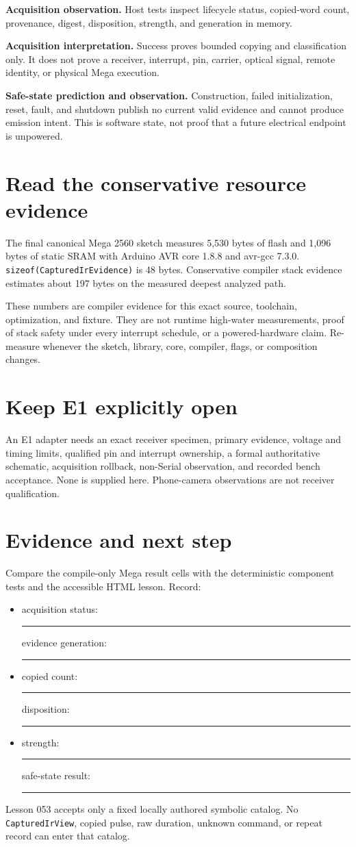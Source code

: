 \documentclass[10pt]{article}
\newcommand{\blankline}{\rule{0.78in}{0.4pt}}
\begin{document}
\textbf{Acquisition observation.} Host tests inspect lifecycle status,
copied-word count, provenance, digest, disposition, strength, and generation
in memory.

\textbf{Acquisition interpretation.} Success proves bounded copying and
classification only. It does not prove a receiver, interrupt, pin, carrier,
optical signal, remote identity, or physical Mega execution.

\textbf{Safe-state prediction and observation.} Construction, failed
initialization, reset, fault, and shutdown publish no current valid evidence
and cannot produce emission intent. This is software state, not proof that a
future electrical endpoint is unpowered.

\section{Read the conservative resource evidence}
The final canonical Mega 2560 sketch measures 5,530 bytes of flash and
1,096 bytes of static SRAM with Arduino AVR core 1.8.8 and avr-gcc 7.3.0.
\texttt{sizeof(CapturedIrEvidence)} is 48 bytes. Conservative compiler stack
evidence estimates about 197 bytes on the measured deepest analyzed path.

These numbers are compiler evidence for this exact source, toolchain,
optimization, and fixture. They are not runtime high-water measurements,
proof of stack safety under every interrupt schedule, or a powered-hardware
claim. Re-measure whenever the sketch, library, core, compiler, flags, or
composition changes.

\section{Keep E1 explicitly open}
An E1 adapter needs an exact receiver specimen, primary evidence, voltage and
timing limits, qualified pin and interrupt ownership, a formal authoritative
schematic, acquisition rollback, non-Serial observation, and recorded bench
acceptance. None is supplied here. Phone-camera observations are not receiver
qualification.

\section{Evidence and next step}
Compare the compile-only Mega result cells with the deterministic component
tests and the accessible HTML lesson. Record:

\begin{itemize}
 \item acquisition status: \blankline\quad evidence generation: \blankline
 \item copied count: \blankline\quad disposition: \blankline
 \item strength: \blankline\quad safe-state result: \blankline
\end{itemize}

Lesson 053 accepts only a fixed locally authored symbolic catalog. No
\texttt{CapturedIrView}, copied pulse, raw duration, unknown command, or
repeat record can enter that catalog.
\end{document}
